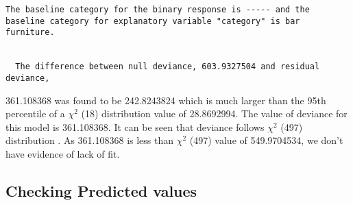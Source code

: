 \documentclass[
]{article}
\begin{document}
\begin{verbatim}
The baseline category for the binary response is ----- and the baseline category for explanatory variable "category" is bar furniture.

  
  The difference between null deviance, 603.9327504 and residual deviance,
\end{verbatim}

361.108368 was found to be 242.8243824 which is much larger than the
95th percentile of a \(\chi^2\) (18) distribution value of 28.8692994.
The value of deviance for this model is 361.108368. It can be seen that
deviance follows \(\chi^2\) (497) distribution . As 361.108368 is less
than \(\chi^2\) (497) value of 549.9704534, we don't have evidence of
lack of fit.

\hypertarget{checking-predicted-values}{%
\subsection{Checking Predicted values}\label{checking-predicted-values}}
\end{document}
